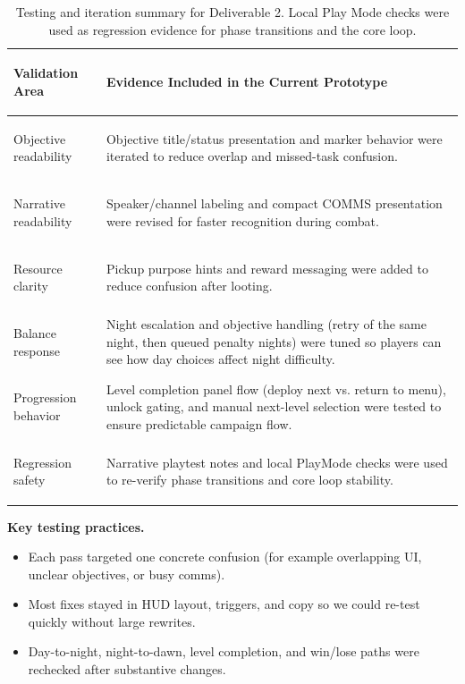 \documentclass[11pt]{article}
\begin{document}
\begin{table}[H]
    \centering
    \begingroup
    \small
    \renewcommand{\arraystretch}{1.2}
    \setlength{\tabcolsep}{7pt}
    \begin{tabularx}{\textwidth}{>{\bfseries\raggedright\arraybackslash}p{} Y}
        \toprule
        Validation Area & Evidence Included in the Current Prototype \\
        \midrule
        Objective readability & Objective title/status presentation and marker behavior were iterated to reduce overlap and missed-task confusion. \\
        \addlinespace[0.25em]
        Narrative readability & Speaker/channel labeling and compact COMMS presentation were revised for faster recognition during combat. \\
        \addlinespace[0.25em]
        Resource clarity & Pickup purpose hints and reward messaging were added to reduce confusion after looting. \\
        \addlinespace[0.25em]
        Balance response & Night escalation and objective handling (retry of the same night, then queued penalty nights) were tuned so players can see how day choices affect night difficulty. \\
        \addlinespace[0.25em]
        Progression behavior & Level completion panel flow (deploy next vs. return to menu), unlock gating, and manual next-level selection were tested to ensure predictable campaign flow. \\
        \addlinespace[0.25em]
        Regression safety & Narrative playtest notes and local PlayMode checks were used to re-verify phase transitions and core loop stability. \\
        \bottomrule
    \end{tabularx}
    \endgroup
    \caption{Testing and iteration summary for Deliverable 2. Local Play Mode checks were used as regression evidence for phase transitions and the core loop.}
\end{table}

\noindent\textbf{Key testing practices.}
\begin{itemize}
    \item Each pass targeted one concrete confusion (for example overlapping UI, unclear objectives, or busy comms).
    \item Most fixes stayed in HUD layout, triggers, and copy so we could re-test quickly without large rewrites.
    \item Day-to-night, night-to-dawn, level completion, and win/lose paths were rechecked after substantive changes.
\end{itemize}
\end{document}
